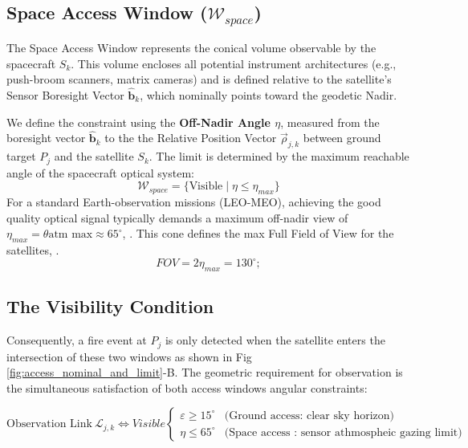 \begin{table}[ht]
{\subsection{Space Access Window ($\mathcal{W}_{space}$)}
The Space Access Window represents the conical volume observable by the spacecraft $S_k$. This volume encloses all potential instrument architectures (e.g., push-broom scanners, matrix cameras) and is defined relative to the satellite's Sensor Boresight Vector $\hat{\mathbf{b}}_k$, which nominally points toward the geodetic Nadir.

We define the constraint using the \textbf{Off-Nadir Angle $\eta$}, measured from the boresight vector $\hat{\mathbf{b}}_k$ to the the Relative Position Vector $\vec{\rho}_{j,k}$ between ground target $P_j$ and the satellite $S_k$. The limit is determined by the maximum reachable angle of the spacecraft optical system:
\begin{equation}
    \mathcal{W}_{space} = \{ \text{Visible} \mid \eta \leq \eta_{max} \}
\end{equation}
For a standard Earth-observation missions (LEO-MEO), achieving the good quality optical signal typically demands a maximum off-nadir view of $\eta_{max} = \theta{\text{atm max}} \approx 65^{\circ}$, . This cone defines the max Full Field of View for the satellites, .
\begin{equation}
    FOV = 2  \eta_{max} = 130^\circ; 
\end{equation}
\subsection{The Visibility Condition}
Consequently, a fire event at $P_j$ is only detected when the satellite enters the intersection of these two windows as shown in Fig \ref{fig:access_nominal_and_limit}-B. The geometric requirement for observation is the simultaneous satisfaction of both access windows angular constraints:

\begin{equation}
    \text{Observation Link} \ \mathcal{L}_{j,k} \iff Visible
    \begin{cases} 
        \varepsilon \geq 15^{\circ} & \text{(Ground access: clear sky horizon)} \\
        \eta \leq 65^{\circ} & \text{(Space access : sensor athmospheic gazing limit)}
    \end{cases}
\end{equation}

}
\end{table}

